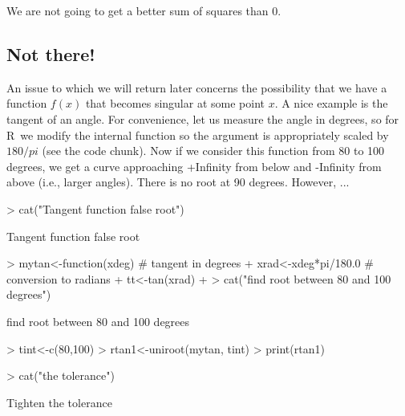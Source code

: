 \documentclass[11pt,letterpaper]{article}
\newcommand{\R}{{\sf R\ }}
\begin{document}
We are not going to get a better sum of squares than 0.

\subsection{Not there!}

An issue to which we will return later concerns the possibility that we have
a function $f(x)$ that becomes singular at some point $x$. A nice example is
the tangent of an angle. For convenience, let us measure the angle in degrees,
so for  \R  we modify the internal function so the argument is appropriately
scaled by $180/pi$ (see the code chunk). Now if we consider this function from
80 to 100 degrees, we get a curve approaching +Infinity from below and -Infinity
from above (i.e., larger angles). There is no root at 90 degrees. However, ...

\begin{Schunk}
\begin{Sinput}
> cat("Tangent function false root\n")
\end{Sinput}
\begin{Soutput}
Tangent function false root
\end{Soutput}
\begin{Sinput}
> mytan<-function(xdeg){ # tangent in degrees
+     xrad<-xdeg*pi/180.0 # conversion to radians
+     tt<-tan(xrad)
+ }
> cat("find root between 80 and 100 degrees\n")
\end{Sinput}
\begin{Soutput}
find root between 80 and 100 degrees
\end{Soutput}
\begin{Sinput}
> tint<-c(80,100)
> rtan1<-uniroot(mytan, tint)
> print(rtan1)
\end{Sinput}
\begin{Sinput}
> cat("\n\nTighten the tolerance\n")
\end{Sinput}
\begin{Soutput}
Tighten the tolerance
\end{Soutput}
\end{Schunk}
\end{document}
